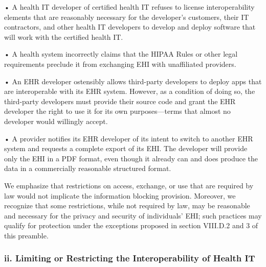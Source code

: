 \documentclass[twoside,11pt]{article}
\begin{document}
          • A health IT developer of certified health IT refuses to license interoperability elements that are reasonably necessary for the developer's customers, their IT contractors, and other health IT developers to develop and deploy software that will work with the certified health IT.



          • A health system incorrectly claims that the HIPAA Rules or other legal requirements preclude it from exchanging EHI with unaffiliated providers. \ifhmode\expandafter\xspace\fi 
          


          • An EHR developer ostensibly allows third-party developers to deploy apps that are interoperable with its EHR system. However, as a condition of doing so, the third-party developers must provide their source code and grant the EHR developer the right to use it for its own purposes—terms that almost no developer would willingly accept.


          • A provider notifies its EHR developer of its intent to switch to another EHR system and requests a complete export of its EHI. The developer will provide only the EHI in a PDF format, even though it already can and does produce the data in a commercially reasonable structured format.


          We emphasize that restrictions on access, exchange, or use that are required by law would not implicate the information blocking provision. Moreover, we recognize that some restrictions, while not required by law, may be reasonable and necessary for the privacy and security of individuals' EHI; such practices may qualify for protection under the exceptions proposed in section VIII.D.2 and 3 of this preamble.


          \subsubsection{ii. Limiting or Restricting the Interoperability of Health IT}
\end{document}
